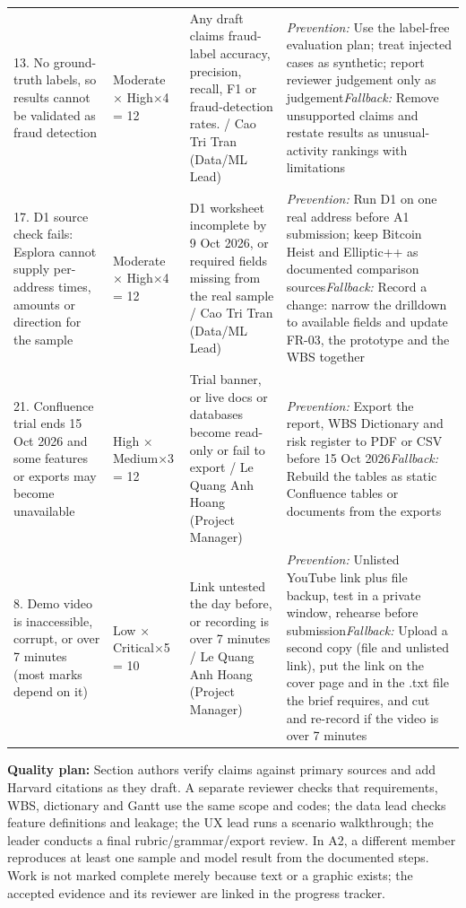 {\begin{xltabular}{\textwidth}{@{}Y L{2.0cm} L{3.6cm} Y@{}}
13. No ground-truth labels, so results cannot be validated as fraud detection & Moderate × High×4 = 12 & Any draft claims fraud-label accuracy, precision, recall, F1 or fraud-detection rates. / Cao Tri Tran (Data/\allowbreak{}ML Lead) & \textit{Prevention:} Use the label-free evaluation plan; treat injected cases as synthetic; report reviewer judgement only as judgement\newline \textit{Fallback:} Remove unsupported claims and restate results as unusual-activity rankings with limitations \\
17. D1 source check fails: Esplora cannot supply per-address times, amounts or direction for the sample & Moderate × High×4 = 12 & D1 worksheet incomplete by 9 Oct 2026, or required fields missing from the real sample / Cao Tri Tran (Data/\allowbreak{}ML Lead) & \textit{Prevention:} Run D1 on one real address before A1 submission; keep Bitcoin Heist and Elliptic++ as documented comparison sources\newline \textit{Fallback:} Record a change: narrow the drilldown to available fields and update FR-03, the prototype and the WBS together \\
21. Confluence trial ends 15 Oct 2026 and some features or exports may become unavailable & High × Medium×3 = 12 & Trial banner, or live docs or databases become read-only or fail to export / Le Quang Anh Hoang (Project Manager) & \textit{Prevention:} Export the report, WBS Dictionary and risk register to PDF or CSV before 15 Oct 2026\newline \textit{Fallback:} Rebuild the tables as static Confluence tables or documents from the exports \\
8. Demo video is inaccessible, corrupt, or over 7 minutes (most marks depend on it) & Low × Critical×5 = 10 & Link untested the day before, or recording is over 7 minutes / Le Quang Anh Hoang (Project Manager) & \textit{Prevention:} Unlisted YouTube link plus file backup, test in a private window, rehearse before submission\newline \textit{Fallback:} Upload a second copy (file and unlisted link), put the link on the cover page and in the .txt file the brief requires, and cut and re-record if the video is over 7 minutes \\
\end{xltabular}
}

\textbf{Quality plan:} Section authors verify claims against primary sources and add Harvard citations as they draft. A separate reviewer checks that requirements, WBS, dictionary and Gantt use the same scope and codes; the data lead checks feature definitions and leakage; the UX lead runs a scenario walkthrough; the leader conducts a final rubric/grammar/export review. In A2, a different member reproduces at least one sample and model result from the documented steps. Work is not marked complete merely because text or a graphic exists; the accepted evidence and its reviewer are linked in the progress tracker.
